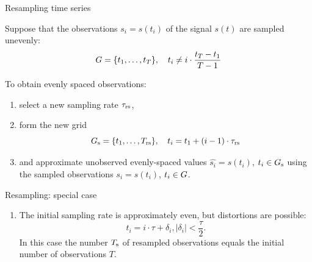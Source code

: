 \documentclass{beamer}
\begin{document}
\begin{frame}{Resampling time series}

Suppose that the observations $s_i = s(t_i)$ of the signal $s(t)$ are sampled unevenly:
\[G = \{t_1, \dots, t_T\}, \quad t_i \neq i\cdot\frac{t_T - t_1}{T-1} \]

\bigskip

To obtain evenly spaced observations:
\begin{enumerate}[1)]
\item select a new sampling rate $\tau_{\text{rs}}$,
\item form the new grid
\[G_{\text{s}} = \{t_1, \dots, T_{\text{rs}} \}, \quad t_i  = t_1 + (i-1)\cdot\tau_{\text{rs}} \]
\item and approximate
unobserved evenly-spaced values $\hat{s_i} = s(t_i)$, $t_i \in G_{\text{s}}$ using the sampled observations $s_i = s(t_i)$, $t_i \in G$.
\end{enumerate}

\end{frame}
\begin{frame}{Resampling: special case}

\begin{enumerate}
\item The initial sampling rate is approximately even, but distortions are possible:
\[ t_i = i\cdot\tau + \delta_i, |\delta_i| < \frac{\tau}{2}.\]
In this case the number $T_{\text{s}}$ of resampled observations equals the initial number of observations $T$.
\end{enumerate}



\end{frame}
\end{document}
